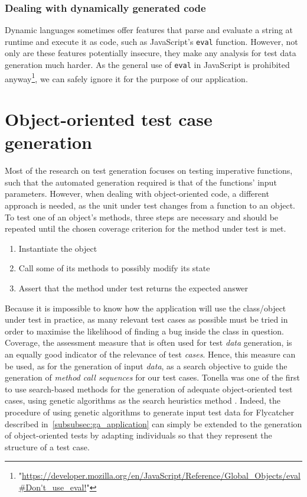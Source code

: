 \subsubsection{Dealing with dynamically generated code}

Dynamic languages sometimes offer features that parse and evaluate a string at runtime and execute it as code, such as JavaScript's \texttt{eval} function. However, not only are these features potentially insecure, they make any analysis for test data generation much harder. As the general use of \texttt{eval} in JavaScript is prohibited anyway\footnote{\tiny"\url{https://developer.mozilla.org/en/JavaScript/Reference/Global_Objects/eval#Don't_use_eval!}"}, we can safely ignore it for the purpose of our application.

\section{Object-oriented test case generation}
\label{OOtests}

Most of the research on test generation focuses on testing imperative functions, such that the automated generation required is that of the functions' input parameters. However, when dealing with object-oriented code, a different approach is needed, as the unit under test changes from a function to an object. To test one of an object's methods, three steps are necessary \cite{tonella2004evolutionary} and should be repeated until the chosen coverage criterion for the method under test is met.

\begin{enumerate}
	\item Instantiate the object
	\item Call some of its methods to possibly modify its state
	\item Assert that the method under test returns the expected answer
\end{enumerate}

Because it is impossible to know how the application will use the class/object under test in practice, as many relevant test cases as possible must be tried in order to maximise the likelihood of finding a bug inside the class in question. Coverage, the assessment measure that is often used for test \emph{data} generation, is an equally good indicator of the relevance of test \emph{cases}. Hence, this measure can be used, as for the generation of input \emph{data}, as a search objective to guide the generation of \emph{method call sequences} for our test cases. Tonella was one of the first to use search-based methods for the generation of adequate object-oriented test cases, using genetic algorithms as the search heuristics method \cite{tonella2004evolutionary}. Indeed, the procedure of using genetic algorithms to generate input test data for \textsf{Flycatcher} described in~\ref{subsubsec:ga_application} can simply be extended to the generation of object-oriented tests by adapting individuals so that they represent the structure of a test case.


